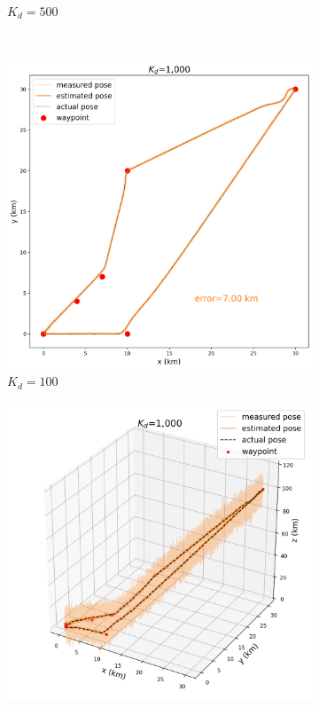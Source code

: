 \begin{figure}[h]
\begin{subfigure}[t]{0.24\textwidth}
		\caption{$K_d=500$}
	\end{subfigure} \\
	\hfill
	\begin{subfigure}[t]{0.24\textwidth}
		\centering
		\includegraphics[width=\linewidth]{figures/Dgain_D10_2d.png}
		\caption{$K_d=100$}
	\end{subfigure} 
	\hfill
	\begin{subfigure}[t]{0.24\textwidth}
		\centering
		\includegraphics[width=\linewidth]{figures/Dgain_D10_3d.png}

\end{subfigure}
\end{figure}
